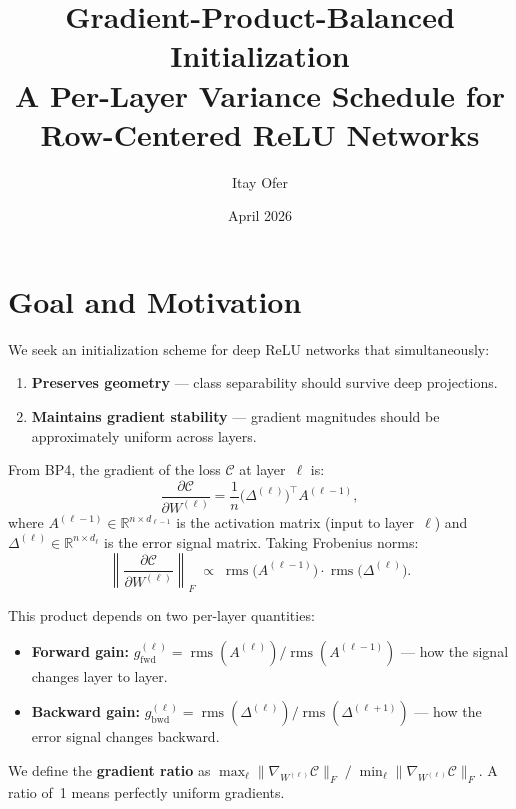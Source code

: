 \documentclass[11pt,a4paper]{article}
\title{%
  Gradient-Product-Balanced Initialization\\[4pt]
  {\large A Per-Layer Variance Schedule for Row-Centered ReLU Networks}
}
\author{Itay Ofer}
\date{April 2026}
\theoremstyle{definition}
\newcommand{\R}{\mathbb{R}}
\newcommand{\rms}{\operatorname{rms}}
\begin{document}
\maketitle
\tableofcontents
\newpage

\section{Goal and Motivation}
\label{sec:motivation}

We seek an initialization scheme for deep ReLU networks that simultaneously:
\begin{enumerate}[nosep]
  \item \textbf{Preserves geometry} --- class separability should survive deep projections.
  \item \textbf{Maintains gradient stability} --- gradient magnitudes should be approximately uniform across layers.
\end{enumerate}

From BP4, the gradient of the loss $\mathcal{C}$ at layer~$\ell$ is:
\begin{equation}\label{eq:bp4}
  \frac{\partial \mathcal{C}}{\partial W^{(\ell)}}
  = \frac{1}{n}\bigl(\Delta^{(\ell)}\bigr)^{\!\top}\! A^{(\ell-1)},
\end{equation}
where $A^{(\ell-1)} \in \R^{n \times d_{\ell-1}}$ is the activation matrix
(input to layer~$\ell$) and $\Delta^{(\ell)} \in \R^{n \times d_\ell}$ is the error signal matrix.
Taking Frobenius norms:
\begin{equation}\label{eq:grad-mag}
  \left\|\frac{\partial \mathcal{C}}{\partial W^{(\ell)}}\right\|_F
  \;\propto\; \rms\!\bigl(A^{(\ell-1)}\bigr) \cdot \rms\!\bigl(\Delta^{(\ell)}\bigr).
\end{equation}

This product depends on two per-layer quantities:
\begin{itemize}[nosep]
  \item \textbf{Forward gain:}
    $g_{\mathrm{fwd}}^{(\ell)} = \rms(A^{(\ell)}) / \rms(A^{(\ell-1)})$
    --- how the signal changes layer to layer.
  \item \textbf{Backward gain:}
    $g_{\mathrm{bwd}}^{(\ell)} = \rms(\Delta^{(\ell)}) / \rms(\Delta^{(\ell+1)})$
    --- how the error signal changes backward.
\end{itemize}
We define the \textbf{gradient ratio} as
$\max_\ell \|\nabla_{W^{(\ell)}}\mathcal{C}\|_F \;/\;
 \min_\ell \|\nabla_{W^{(\ell)}}\mathcal{C}\|_F$.
A ratio of~1 means perfectly uniform gradients.
\end{document}
